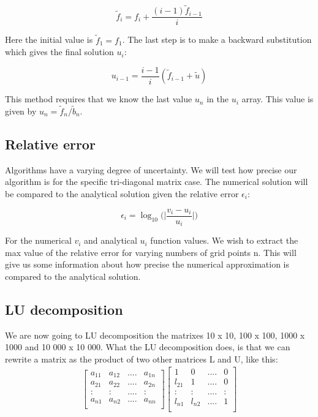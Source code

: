 \documentclass[norsk,a4paper,12pt]{article}
\begin{document}
\begin{equation}
\tilde{f}_i = f_i + \frac{(i-1)\tilde{f}_{i-1}}{i}
 \label{eq:f_i}
 \end{equation}

Here the initial value is $\tilde{f}_1=f_1$. The last step is to make a backward substitution which gives the final solution $u_i$:

\begin{equation}
u_{i-1}=\frac{i-1}{i}(\tilde{f}_{i-1}+\tilde{u})
 \label{eq:u_i-1}
 \end{equation}
 
 This method requires that we know the last value $u_n$ in the $u_i$ array. This value is given by $u_n=\tilde{f}_n/\tilde{b}_n$. 
 
 \subsection{Relative error}
 
 Algorithms have a varying degree of uncertainty. We will test how precise our algorithm is for the specific tri-diagonal matrix case. The numerical solution will be compared to the analytical solution given the relative error $\epsilon_i$:
 
 \begin{equation}
\epsilon_i = \log_{10}\bigg(\bigg|\frac{v_i-u_i}{u_i}\bigg|\bigg)
 \label{eq:f_i}
 \end{equation}
 
For the numerical $v_i$ and analytical $u_i$ function values. We wish to extract the max value of the relative error for varying numbers of grid points n. This will give us some information about how precise the numerical approximation is compared to the analytical solution.

 \subsection{LU decomposition}

We are now going to LU decomposition the matrixes 10 x 10, 100 x 100, 1000 x 1000 and 10 000 x 10 000. What the LU decomposition does, is that we can rewrite a matrix as the product of two other matrices L and U, like this:
\begin{align*}
\begin{bmatrix}
a_{11} & a_{12} & .... & a_{1n} \\
a_{21} & a_{22} & .... & a_{2n} \\
: & :& .... & : \\
a_{n1} & a_{n2} & .... & a_{nn} \\
\end{bmatrix}
\begin{bmatrix}
1 & 0 & .... & 0 \\
l_{21} & 1 & .... & 0 \\
: & :& .... & : \\
l_{n1} & l_{n2} & .... & 1\\
\end{bmatrix}
\end{align*}
\end{document}
